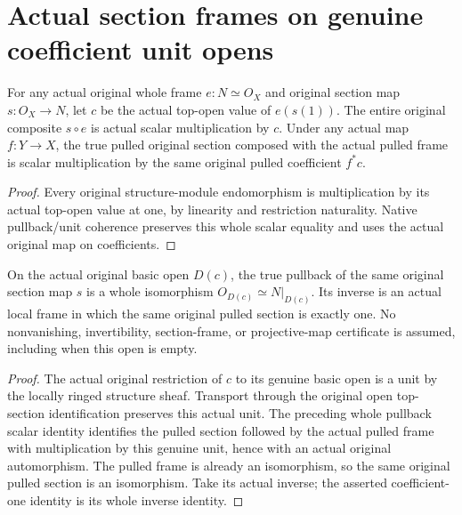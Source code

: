 \section{Actual section frames on genuine coefficient unit opens}

\begin{definition}
\label{def:fc-original-section-whole-frame-scalar}
\leanok
{}
For any actual original whole frame $e:N\simeq O_X$ and original
section map $s:O_X\to N$, let $c$ be the actual top-open value of
$e(s(1))$. The entire original composite $s\circ e$ is actual scalar
multiplication by $c$. Under any actual map $f:Y\to X$, the true
pulled original section composed with the actual pulled frame is
scalar multiplication by the same original pulled coefficient
$f^*c$.
\end{definition}
\begin{proof}
Every original structure-module endomorphism is multiplication by its
actual top-open value at one, by linearity and restriction
naturality. Native pullback/unit coherence preserves this whole
scalar equality and uses the actual original map on coefficients.
\end{proof}

\begin{theorem}
\label{thm:fc-original-section-basic-open-frame}
\leanok
{}
On the actual original basic open $D(c)$, the true pullback of the
same original section map $s$ is a whole isomorphism
$O_{D(c)}\simeq N|_{D(c)}$. Its inverse is an actual local frame in
which the same original pulled section is exactly one. No
nonvanishing, invertibility, section-frame, or projective-map
certificate is assumed, including when this open is empty.
\end{theorem}
\begin{proof}
The actual original restriction of $c$ to its genuine basic open is a
unit by the locally ringed structure sheaf. Transport through the
original open top-section identification preserves this actual unit.
The preceding whole pullback scalar identity identifies the pulled
section followed by the actual pulled frame with multiplication by
this genuine unit, hence with an actual original automorphism. The
pulled frame is already an isomorphism, so the same original pulled
section is an isomorphism. Take its actual inverse; the asserted
coefficient-one identity is its whole inverse identity.
\end{proof}

